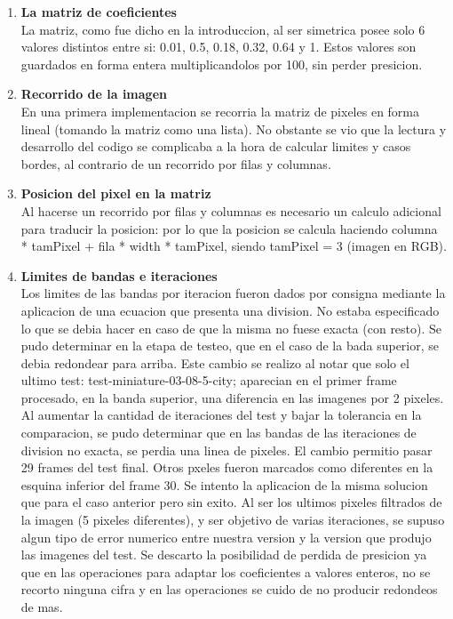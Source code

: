 \begin{enumerate}
\item \textbf{La matriz de coeficientes} \\
La matriz, como fue dicho en la introduccion, al ser simetrica posee solo 6 valores distintos entre si: 0.01, 0.5, 0.18, 0.32, 0.64 y 1. Estos valores son guardados en forma entera multiplicandolos por 100, sin perder presicion.\\

\item \textbf{Recorrido de la imagen} \\
En una primera implementacion se recorria la matriz de pixeles en forma lineal (tomando la matriz como una lista). No obstante se vio que la lectura y desarrollo del codigo se complicaba a la hora de calcular limites y casos bordes, al contrario de un recorrido por filas y columnas.\\

\item \textbf{Posicion del pixel en la matriz} \\
Al hacerse un recorrido por filas y columnas es necesario un calculo adicional para traducir la posicion: por lo que la posicion se calcula haciendo columna * tamPixel + fila * width * tamPixel, siendo tamPixel = 3 (imagen en RGB).\\

\item \textbf{Limites de bandas e iteraciones} \\
Los limites de las bandas por iteracion fueron dados por consigna mediante la aplicacion de una ecuacion que presenta una division. No estaba especificado lo que se debia hacer en caso de que la misma no fuese exacta (con resto). Se pudo determinar en la etapa de testeo, que en el caso de la bada superior, se debia redondear para arriba. Este cambio se realizo al notar que solo el ultimo test: test-miniature-03-08-5-city; aparecian en el primer frame procesado, en la banda superior, una diferencia en las imagenes por 2 pixeles. Al aumentar la cantidad de iteraciones del test y bajar la tolerancia en la comparacion, se pudo determinar que en las bandas de las iteraciones de division no exacta, se perdia una linea de pixeles. El cambio permitio pasar 29 frames del test final.
 Otros pxeles fueron marcados como diferentes en la esquina inferior del frame 30. Se intento la aplicacion de la misma solucion que para el caso anterior pero sin exito. Al ser los ultimos pixeles filtrados de la imagen (5 pixeles diferentes), y ser objetivo de varias iteraciones, se supuso  algun tipo de error numerico entre nuestra version y la version que produjo las imagenes del test. Se descarto la posibilidad de perdida de presicion ya que en las operaciones para adaptar los coeficientes a valores enteros, no se recorto ninguna cifra y en las operaciones se cuido de no producir redondeos de mas.
\\


\end{enumerate}
